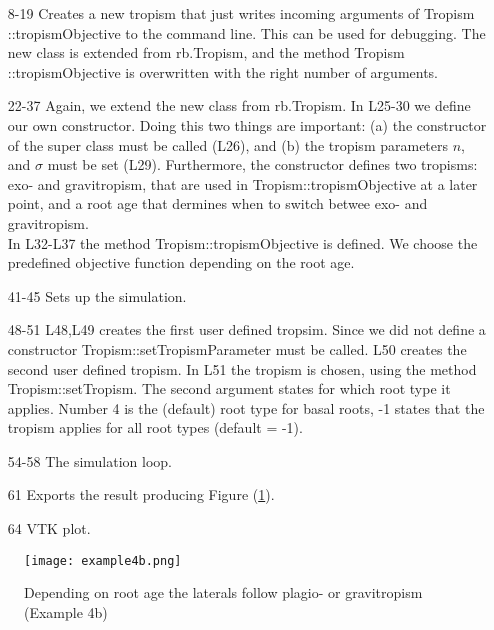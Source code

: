 \begin{itemize}

\item[8-19] Creates a new tropism that just writes incoming arguments of Tropism ::tropismObjective to the command line. This can be used for debugging. The new class is extended from rb.Tropism, and the method Tropism ::tropismObjective is overwritten with the right number of arguments.

\item[22-37] Again, we extend the new class from rb.Tropism. In L25-30 we define our own constructor. Doing this two things are important: (a) the constructor of the super class must be called (L26), and (b) the tropism parameters $n$, and $\sigma$ must be set (L29). 
Furthermore, the constructor defines two tropisms: exo- and gravitropism, that are used in Tropism::tropismObjective at a later point, and a root age that dermines when to switch betwee exo- and gravitropism. \\
In L32-L37 the method Tropism::tropismObjective is defined. We choose the predefined objective function depending on the root age.

\item[41-45] Sets up the simulation.

\item[48-51] L48,L49 creates the first user defined tropsim. Since we did not define a constructor Tropism::setTropismParameter must be called. L50 creates the second user defined tropism.  In L51 the tropism is chosen, using the method Tropism::setTropism. The second argument states for which root type it applies. 
Number 4 is the (default) root type for basal roots, -1 states that the tropism applies for all root types (default = -1).

\item[54-58] The simulation loop. 

\item [61] Exports the result producing Figure (\ref{fig:tropism}). 

\item [64] VTK plot.

\end{itemize}

\begin{figure}
\centering
\texttt{[image: example4b.png]}
\caption{Depending on root age the laterals follow plagio- or gravitropism (Example 4b)} \label{fig:tropism}
\end{figure}

